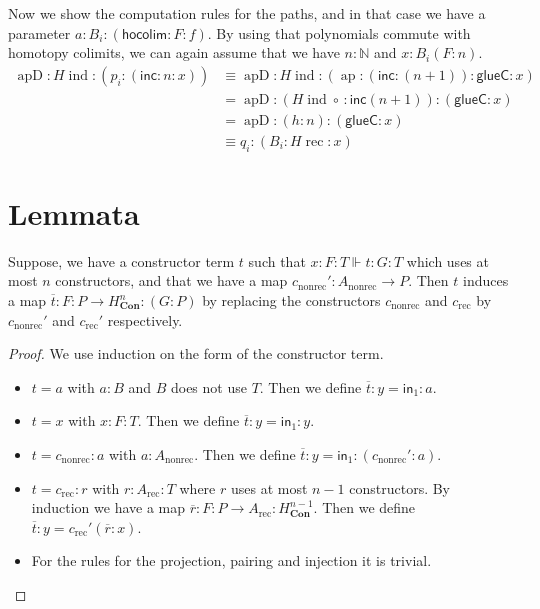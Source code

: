 \documentclass[a4paper,UKenglish]{lipics-v2016}
\newcommand{\Boperator}[1]{\mathsf{#1}}
\newcommand{\inn}{\Boperator{in}}
\newcommand{\comp}[0]{\circ \,}
\newcommand{\frec}[0]{\!\operatorname{rec}}
\newcommand{\ind}[0]{\!\operatorname{ind}}
\newcommand{\rec}[0]{\operatorname{rec}}
\newcommand{\nonrec}[0]{\operatorname{nonrec}}
\newcommand{\ap}[0]{\operatorname{ap}}
\newcommand{\apd}[0]{\operatorname{apD}}
\newcommand{\Con}[0]{\textbf{Con}}
\newcommand{\glueC}[0]{\Boperator{glueC}}
\newcommand{\hocolim}[0]{\Boperator{hocolim}}
\newcommand{\inc}[0]{\Boperator{inc}}
\begin{document}
Now we show the computation rules for the paths, and in that case we have a parameter $a : B_i : (\hocolim : F : f)$.
By using that polynomials commute with homotopy colimits, we can again assume that we have $n : \mathbb{N}$ and $x : B_i(F : n)$.
\begin{equation*}
\begin{split}
\apd : H\ind : (p_i : (\inc : n : x))
&\equiv \apd : H\ind : (\ap : (\inc : (n+1)) : \glueC : x)\\
&= \apd : (H\ind \comp  : \inc (n+1)) : (\glueC : x)\\
&= \apd : (h : n) : (\glueC : x)\\
&\equiv q_i : (B_i : H\frec : x)
\end{split}
\end{equation*}


\section{Lemmata}
\label{sec:Lemmata}
\begin{lemma}
\label{lem:constrTerm}
Suppose, we have a constructor term $t$ such that $x : F : T \Vdash t : G :T$ which uses at most $n$ constructors, and that we have a map $c_{\nonrec}' : A_{\nonrec} \rightarrow P$.
Then $t$ induces a map $\overline{t} : F : P \rightarrow H_{\Con}^n : (G : P)$ by replacing the constructors $c_{\nonrec}$ and $c_{\rec}$ by $c_{\nonrec}'$ and $c_{\rec}'$ respectively.
\end{lemma}

\begin{proof}
We use induction on the form of the constructor term.
\begin{itemize}
        \item $t = a$ with $a : B$ and $B$ does not use $T$. Then we define $\overline{t} : y = \inn_1 : a$.
        \item $t = x$ with $x : F : T$. Then we define $\overline{t} : y = \inn_1 : y$.
        \item $t = c_{\nonrec} : a$ with $a : A_{\nonrec}$. Then we define $\overline{t} : y = \inn_1 : (c_{\nonrec}' : a)$.
        \item $t = c_{\rec} : r$ with $r : A_{\rec} : T$ where $r$ uses at most $n-1$ constructors. 
        By induction we have a map $\overline{r} : F : P \rightarrow A_{\rec} : H_{\Con}^{n-1}$.
        Then we define $\overline{t} : y = c_{\rec}' (\overline{r} : x)$.
        \item For the rules for the projection, pairing and injection it is trivial. \qedhere
\end{itemize}
\end{proof}
\end{document}
